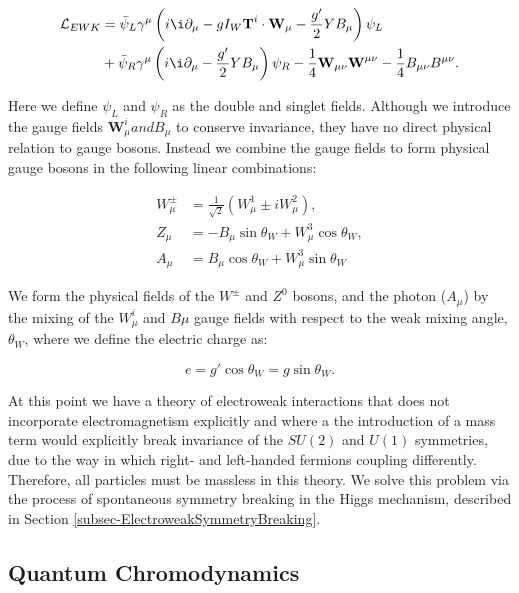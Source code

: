 \begin{equation}
\begin{split}
\lumi_{EWK} & = \bar{\psi}_L \gamma^{\mu} \left(i \i\partial_{\mu} - g I_W \textbf{T}^i \cdot \textbf{W}_{\mu} - \frac{g'}{2} Y B_{\mu}\right)\psi_L \\
& + \bar{\psi}_R \gamma^{\mu}\left(i \i\partial_{\mu} - \frac{g'}{2} Y B_{\mu}\right)\psi_R - \frac{1}{4}\textbf{W}_{\mu \nu}\textbf{W}^{\mu \nu} - \frac{1}{4} B_{\mu \nu} B^{\mu \nu} .
\end{split}
\end{equation}

Here we define $\psi_L$ and $\psi_R$ as the double and singlet fields. Although we introduce the gauge fields $\textbf{W}^i_{\mu} and B_{\mu}$ to conserve invariance, they have no direct physical relation to gauge bosons. Instead we combine the gauge fields to form physical gauge bosons in the following linear combinations:

\begin{align}
W^{\pm}_{\mu} & = \frac{1}{\sqrt{2}}(W^1_{\mu} \pm iW^2_{\mu}), \\
Z_{\mu} & = -B_{\mu}\sin\theta_W + W^3_{\mu}\cos\theta_W, \\
A_{\mu} & = B_{\mu}\cos\theta_W + W^3_{\mu}\sin\theta_W
\end{align}   

We form the physical fields of the $W^{\pm}$ and $Z^0$ bosons, and the photon ($A_{\mu}$) by the mixing of the $W^i_{\mu}$ and $B{\mu}$ gauge fields with respect to the weak mixing angle, $\theta_W$, where we define the electric charge as:

\begin{equation}
e = g'\cos\theta_W = g \sin\theta_W.
\end{equation}

At this point we have a theory of electroweak interactions that does not incorporate electromagnetism explicitly and where a the introduction of a mass term would explicitly break invariance of the $SU(2)$ and $U(1)$ symmetries, due to the way in which right- and left-handed fermions coupling differently. Therefore, all particles must be massless in this theory. We solve this problem via the process of spontaneous symmetry breaking in the Higgs mechanism, described in Section \ref{subsec-ElectroweakSymmetryBreaking}.  

\subsection{Quantum Chromodynamics} \label{subsec-QuantumChromodynamics}

